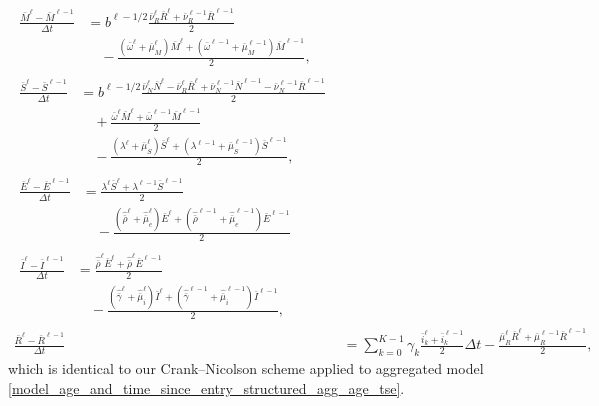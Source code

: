 \documentclass[USenglish]{article}
\begin{document}
\begin{subequations}
  \label{numerics_age_and_time_since_entry_structured_agg_age_tse}
  \begin{align}
    \begin{split}
      \frac{\bar{M}^{\ell} - \bar{M}^{\ell - 1}}{\Delta t}
      &=
      b^{\ell - 1 / 2}
      \frac{\bar{\nu}_R^{\ell} \bar{R}^{\ell}
        + \bar{\nu}_R^{\ell - 1} \bar{R}^{\ell - 1}}{2}
      \\ & \quad {}
      - \frac{(\bar{\omega}^{\ell} + \bar{\mu}_M^{\ell}) \bar{M}^{\ell}
        + (\bar{\omega}^{\ell - 1} + \bar{\mu}_M^{\ell - 1}) \bar{M}^{\ell - 1}}
      {2},
    \end{split}
    \\
    \begin{split}
      \frac{\bar{S}^{\ell} - \bar{S}^{\ell - 1}}{\Delta t}
      &= b^{\ell - 1 / 2}
      \frac{\bar{\nu}_N^{\ell} \bar{N}^{\ell}
        - \bar{\nu}_R^{\ell} \bar{R}^{\ell}
        + \bar{\nu}_N^{\ell - 1} \bar{N}^{\ell - 1}
        - \bar{\nu}_N^{\ell - 1} \bar{R}^{\ell - 1}}{2}
      \\ & \quad {}
      + \frac{\bar{\omega}^{\ell} \bar{M}^{\ell}
        + \bar{\omega}^{\ell - 1} \bar{M}^{\ell - 1}}{2}
      \\ & \quad {}
      - \frac{(\lambda^{\ell} + \bar{\mu}_S^{\ell}) \bar{S}^{\ell}
        + (\lambda^{\ell - 1} + \bar{\mu}_S^{\ell - 1}) \bar{S}^{\ell - 1}}{2},
    \end{split}
    \\
    \begin{split}
      \frac{\bar{E}^{\ell} - \bar{E}^{\ell - 1}}{\Delta t}
      &= \frac{
        \lambda^{\ell} \bar{S}^{\ell}
        + \lambda^{\ell - 1} \bar{S}^{\ell - 1}
      }{2}
      \\ & \quad {}
      - \frac{
        (\hat{\bar{\rho}}^{\ell} + \hat{\bar{\mu}}_e^{\ell})
        \bar{E}^{\ell}
        + (\hat{\bar{\rho}}^{\ell - 1} + \hat{\bar{\mu}}_e^{\ell - 1})
        \bar{E}^{\ell - 1}
      }{2}
    \end{split}
    \\
    \begin{split}
      \frac{\bar{I}^{\ell} - \bar{I}^{\ell - 1}}{\Delta t}
      &= \frac{
        \hat{\bar{\rho}}^{\ell} \bar{E}^{\ell}
        + \hat{\bar{\rho}}^{\ell} \bar{E}^{\ell - 1}
      }{2}
      \\ & \quad {}
      - \frac{
        (\hat{\bar{\gamma}}^{\ell} + \hat{\bar{\mu}}_i^{\ell})
        \bar{I}^{\ell}
        + (\hat{\bar{\gamma}}^{\ell - 1} + \hat{\bar{\mu}}_i^{\ell - 1})
        \bar{I}^{\ell - 1}
      }{2},
    \end{split}
    \\
    \frac{\bar{R}^{\ell} - \bar{R}^{\ell - 1}}{\Delta t}
    &= \sum_{k = 0}^{K - 1} \gamma_k
    \frac{\bar{i}_k^{\ell} + \bar{i}_k^{\ell - 1}}{2} \Delta t
    - \frac{
      \bar{\mu}_R^{\ell} \bar{R}^{\ell}
      + \bar{\mu}_R^{\ell - 1} \bar{R}^{\ell - 1}
    }{2},
  \end{align}
\end{subequations}
which is identical to our Crank--Nicolson scheme applied to aggregated
model \eqref{model_age_and_time_since_entry_structured_agg_age_tse}.
\end{document}

